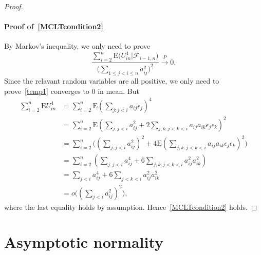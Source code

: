 \documentclass[review]{elsarticle}
\theoremstyle{plain}
\theoremstyle{definition}
\theoremstyle{remark}
\begin{document}
\begin{proof}
     \paragraph{Proof of~\eqref{MCLTcondition2}}
     By Markov's inequality, we only need to prove
     \begin{equation}\label{temp1}
         \frac{\sum_{i=2}^n \mathrm{E}\big(U_{in}^4\big|\mathcal{F}_{i-1,n}\big)}{{\big(\sum_{1\leq j<i\leq n} a_{ij}^2\big)}^2}\xrightarrow{P} 0.
     \end{equation}
     Since the relavant random variables are all positive, we only need to prove~\eqref{temp1} converges to $0$ in mean. But
     \begin{equation*}
         \begin{aligned}
         \sum_{i=2}^n \mathrm{E} U_{in}^4
             &=
             \sum_{i=2}^n \mathrm{E} {(\sum_{j:j<i}a_{ij}\epsilon_j)}^4\\
             &=
             \sum_{i=2}^n \mathrm{E} {(\sum_{j:j<i}a_{ij}^2+2\sum_{j,k:j<k<i}a_{ij}a_{ik}\epsilon_j \epsilon_k)}^2\\
             &=
             \sum_{i=2}^n  \big({(\sum_{j:j<i}a_{ij}^2)}^2+4\mathrm{E}{(\sum_{j,k:j<k<i}a_{ij}a_{ik}\epsilon_j \epsilon_k)}^2 \big)\\
             &=
             \sum_{i=2}^n  (\sum_{j:j<i}a_{ij}^4+6\sum_{j,k:j<k<i}a_{ij}^2 a_{ik}^2)\\
             &=
             \sum_{j<i}a_{ij}^4+6\sum_{j<k<i}a_{ij}^2 a_{ik}^2\\
             &=
             o\big({(\sum_{j<i} a_{ij}^2)}^2\big),
         \end{aligned}
     \end{equation*}
     where the last equality holds by assumption. Hence~\eqref{MCLTcondition2} holds.
 \end{proof}

\section{Asymptotic normality}
\end{document}
